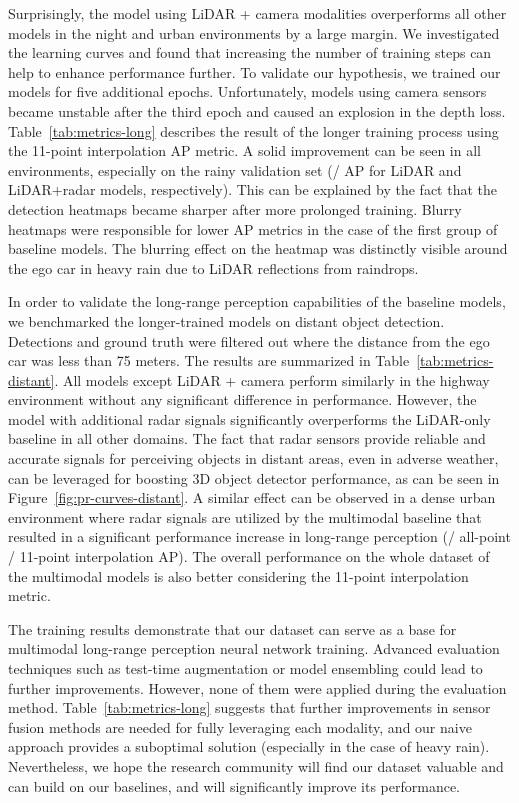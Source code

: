 \documentclass{article}
\begin{document}
Surprisingly, the model using LiDAR + camera modalities overperforms all other models in the night and urban environments by a large margin. We investigated the learning curves and found that increasing the number of training steps can help to enhance performance further. To validate our hypothesis, we trained our models for five additional epochs. Unfortunately, models using camera sensors became unstable after the third epoch and caused an explosion in the depth loss. Table~\ref{tab:metrics-long} describes the result of the longer training process using the 11-point interpolation AP metric. A solid improvement can be seen in all environments, especially on the rainy validation set (/ AP for LiDAR and LiDAR+radar models, respectively). This can be explained by the fact that the detection heatmaps became sharper after more prolonged training. Blurry heatmaps were responsible for lower AP metrics in the case of the first group of baseline models. The blurring effect on the heatmap was distinctly visible around the ego car in heavy rain due to LiDAR reflections from raindrops.

In order to validate the long-range perception capabilities of the baseline models, we benchmarked the longer-trained models on distant object detection. Detections and ground truth were filtered out where the distance from the ego car was less than 75 meters. The results are summarized in Table~\ref{tab:metrics-distant}. All models except LiDAR + camera perform similarly in the highway environment without any significant difference in performance. However, the model with additional radar signals significantly overperforms the LiDAR-only baseline in all other domains. The fact that radar sensors provide reliable and accurate signals for perceiving objects in distant areas, even in adverse weather, can be leveraged for boosting 3D object detector performance, as can be seen in Figure~\ref{fig:pr-curves-distant}. A similar effect can be observed in a dense urban environment where radar signals are utilized by the multimodal baseline that resulted in a significant performance increase in long-range perception (/ all-point / 11-point interpolation AP). The overall performance on the whole dataset of the multimodal models is also better considering the 11-point interpolation metric. 

The training results demonstrate that our dataset can serve as a base for multimodal long-range perception neural network training. Advanced evaluation techniques such as test-time augmentation or model ensembling could lead to further improvements. However, none of them were applied during the evaluation method. Table~\ref{tab:metrics-long} suggests that further improvements in sensor fusion methods are needed for fully leveraging each modality, and our naive approach provides a suboptimal solution (especially in the case of heavy rain). Nevertheless, we hope the research community will find our dataset valuable and can build on our baselines, and will significantly improve its performance.
\end{document}
